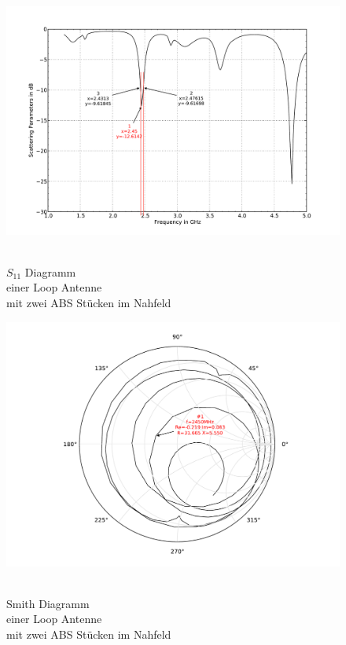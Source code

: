 \begin{figure}[!ht]
\begin{center} 
  \includegraphics[width=\linewidth]{content/bilder/Evaluation/Loop/Kurz3/S11Loop2ABS.pdf}
  \caption{\\$S_{11}$ Diagramm \\einer Loop Antenne \\mit zwei ABS Stücken im Nahfeld}\label{fig:S11_Loop_2ABS_5}
\endminipage%
{}
  \includegraphics[width=\linewidth]{content/bilder/Evaluation/Loop/Kurz3/SmithLoop2ABS.pdf}
  \caption{\\Smith Diagramm \\einer Loop Antenne \\mit zwei ABS Stücken im Nahfeld}\label{fig:Smith_Loop_2ABS_6}
\endminipage
\end{center}
\end{figure}

